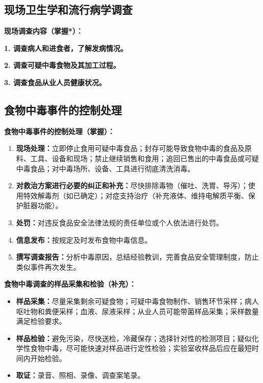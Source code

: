 \subsection{现场卫生学和流行病学调查}

\begin{keybox}
\textbf{现场调查内容（掌握*）：}

\textbf{1. 调查病人和进食者，了解发病情况。}

\textbf{2. 调查可疑中毒食物及其加工过程。}

\textbf{3. 调查食品从业人员健康状况。}
\end{keybox}

\subsection{食物中毒事件的控制处理}

\begin{keybox}
\textbf{食物中毒事件的控制处理（掌握）：}
\begin{enumerate}[leftmargin=*]
    \item \textbf{现场处理：}立即停止食用可疑中毒食品；封存可能导致食物中毒的食品及原料、工具、设备和现场；禁止继续销售和食用；追回已售出的中毒食品或可疑中毒食品；对中毒场所、设备、工具进行彻底清洗消毒。
    \item \textbf{对救治方案进行必要的纠正和补充：}尽快排除毒物（催吐、洗胃、导泻）；使用特效解毒剂（如已确定）；对症支持治疗（补充液体、维持电解质平衡、保护脏器功能）。
    \item \textbf{处罚：}对违反食品安全法律法规的责任单位或个人依法进行处罚。
    \item \textbf{信息发布：}按规定及时发布食物中毒信息。
    \item \textbf{撰写调查报告：}分析中毒原因，总结经验教训，完善食品安全管理制度，防止类似事件再次发生。
\end{enumerate}
\end{keybox}

\begin{tipbox}
\textbf{食物中毒调查的样品采集和检验（补充）：}
\begin{itemize}[leftmargin=*]
    \item \textbf{样品采集：}尽量采集剩余可疑食物；可疑中毒食物制作、销售环节采样；病人呕吐物和粪便采样；血液、尿液采样；从业人员可能带菌样品采集；采样数量满足检验要求。
    \item \textbf{样品检验：}避免污染，尽快送检，冷藏保存；选择针对性的检测项目；疑似化学性食物中毒，尽可能快速对样品进行定性检验；实验室收样品后应在最短时间内开始检验。
    \item \textbf{取证：}录音、照相、录像、调查案笔录。
\end{itemize}
\end{tipbox}

